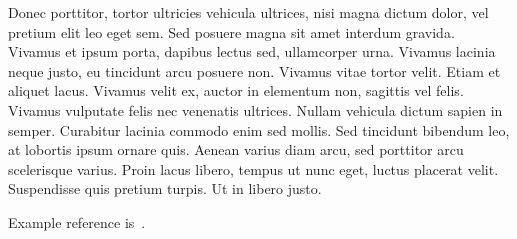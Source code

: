 Donec porttitor, tortor ultricies vehicula ultrices, nisi magna dictum dolor, vel pretium elit leo eget sem. Sed posuere magna sit amet interdum gravida. Vivamus et ipsum porta, dapibus lectus sed, ullamcorper urna. Vivamus lacinia neque justo, eu tincidunt arcu posuere non. Vivamus vitae tortor velit. Etiam et aliquet lacus. Vivamus velit ex, auctor in elementum non, sagittis vel felis. Vivamus vulputate felis nec venenatis ultrices. Nullam vehicula dictum sapien in semper. Curabitur lacinia commodo enim sed mollis. Sed tincidunt bibendum leo, at lobortis ipsum ornare quis. Aenean varius diam arcu, sed porttitor arcu scelerisque varius. Proin lacus libero, tempus ut nunc eget, luctus placerat velit. Suspendisse quis pretium turpis. Ut in libero justo.

Example reference is~\cite{HanResearchAgenda}.
